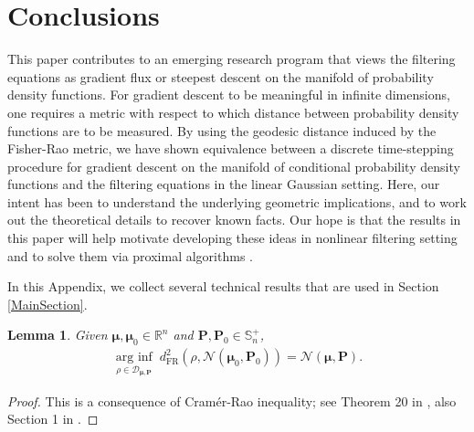 \documentclass[letterpaper,10pt,twocolumn,conference]{ieeeconf}
\newtheorem{lemma}{Lemma}
\newcommand{\cD}{{\mathscr{D}}}
\newcommand{\bmu}{\bm{\mu}}
\newcommand{\bbP}{{\bm{P}}}
\newcommand{\arginf}{\operatorname{arg\:inf}}
\newcommand{\dFR}{d_{\mathrm{FR}}}
\begin{document}
\section{Conclusions} 
This paper contributes to an emerging research program that views the filtering equations as gradient flux or steepest descent on the manifold of probability density functions. For gradient descent to be meaningful in infinite dimensions, one requires a metric with respect to which distance between probability density functions are to be measured. By using the geodesic distance induced by the Fisher-Rao metric, we have shown equivalence between a discrete time-stepping procedure for gradient descent on the manifold of conditional probability density functions and the filtering equations in the linear Gaussian setting. Here, our intent has been to understand the underlying geometric implications, and to work out the theoretical details to recover known facts. Our hope is that the results in this paper will help motivate developing these ideas in nonlinear filtering setting and to solve them via proximal algorithms \cite{ParikhBoyd2014}.



\appendix
In this Appendix, we collect several technical results that are used in Section \ref{MainSection}.

\begin{lemma}\label{MinFisherRaoFromGaussianUnderCovConstraint}
	Given $\bmu,\bmu_{0}\in\mathbb{R}^{n}$ and $\bbP,\bbP_{0} \in \mathbb{S}_{n}^{+}$, 
	\begin{align*}
		\underset{\rho\in\cD_{\bmu,\bbP}}{\arginf} \; \dFR^{2}\left(\rho,\mathcal{N}\left(\bmu_{0},\bbP_{0}\right)\right)= \mathcal{N}\left(\bmu,\bbP\right).
	\end{align*}
\end{lemma}
\begin{proof}
This is a consequence of Cram\'er-Rao inequality; see Theorem 20 in \cite[p. 1512]{DemboCoverThomas1991}, also Section 1 in \cite{Bercher2012}.  	
\end{proof}
\end{document}
